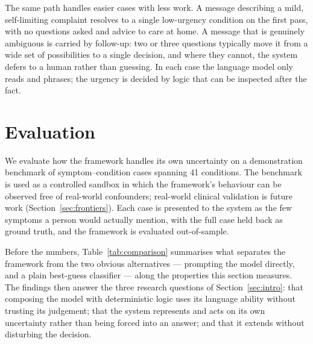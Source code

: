 \documentclass[11pt]{article}
\begin{document}
The same path handles easier cases with less work. A message describing a mild, self-limiting complaint
resolves to a single low-urgency condition on the first pass, with no questions asked and advice to care at
home. A message that is genuinely ambiguous is carried by follow-up: two or three questions typically move it
from a wide set of possibilities to a single decision, and where they cannot, the system defers to a human
rather than guessing. In each case the language model only reads and phrases; the urgency is decided by logic
that can be inspected after the fact.

\section{Evaluation}
\label{sec:eval}
We evaluate how the framework handles its own uncertainty on a demonstration benchmark of symptom--condition
cases spanning 41 conditions. The benchmark is used as a controlled sandbox in which the framework's behaviour
can be observed free of real-world confounders; real-world clinical validation is future work
(Section~\ref{sec:frontiers}). Each case is presented to the system as the few symptoms a person would
actually mention, with the full case held back as ground truth, and the framework is evaluated out-of-sample.

Before the numbers, Table~\ref{tab:comparison} summarises what separates the framework from the two obvious
alternatives --- prompting the model directly, and a plain best-guess classifier --- along the properties
this section measures. The findings then answer the three research questions of Section~\ref{sec:intro}: that
composing the model with deterministic logic uses its language ability without trusting its judgement; that
the system represents and acts on its own uncertainty rather than being forced into an answer; and that it
extends without disturbing the decision.
\end{document}
